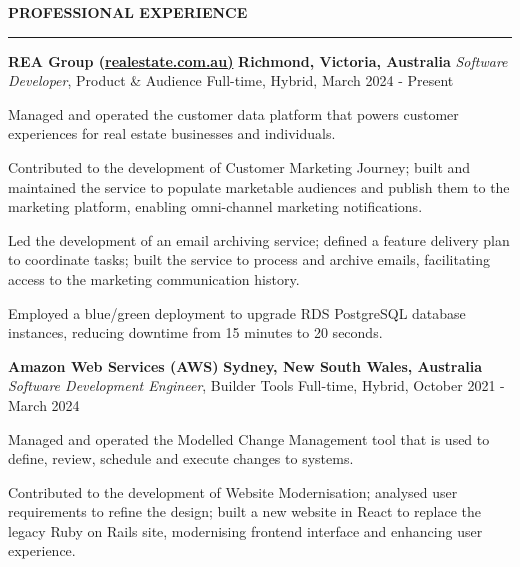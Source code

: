\documentclass{cv}
\begin{document}
\textbf{\uppercase{Professional Experience}}
\sectionlineskip
\hrule height 0.6pt
\begin{list}{}{\setlength{\leftmargin}{0pt}}
\item
    \textbf{REA Group (\href{https://realestate.com.au/}{realestate.com.au)}} \hfill \textbf{Richmond, Victoria, Australia}%
    \vspace{1.0pt} \newline 
    {\textit{Software Developer}, Product \& Audience} \hfill {Full-time, Hybrid, March 2024 - Present}%
    \begin{list}{\raisebox{2.0pt}{\tiny$\bullet$}\space}{\setlength{\leftmargin}{11.2pt}}
        \itemsep -5.0pt \vspace{-4.0pt}
        \item Managed and operated the customer data platform that powers customer experiences for real estate businesses and individuals.
        \item Contributed to the development of Customer Marketing Journey; built and maintained the service to populate marketable audiences and publish them to the marketing platform, enabling omni-channel marketing notifications.
        \item Led the development of an email archiving service; defined a feature delivery plan to coordinate tasks; built the service to process and archive emails, facilitating access to the marketing communication history.
        \item Employed a blue/green deployment to upgrade RDS PostgreSQL database instances, reducing downtime from 15 minutes to 20 seconds.
    \end{list}
\item 
    \textbf{Amazon Web Services (AWS)} \hfill \textbf{Sydney, New South Wales, Australia}%
    \vspace{1.0pt} \newline 
    {\textit{Software Development Engineer}, Builder Tools} \hfill {Full-time, Hybrid, October 2021 - March 2024}%
    \begin{list}{\raisebox{2.0pt}{\tiny$\bullet$}\space}{\setlength{\leftmargin}{11.2pt}}
        \itemsep -5.0pt \vspace{-4.0pt}
        \item Managed and operated the Modelled Change Management tool that is used to define, review, schedule and execute changes to systems.
        \item Contributed to the development of Website Modernisation; analysed user requirements to refine the design; built a new website in React to replace the legacy Ruby on Rails site, modernising frontend interface and enhancing user experience.

\end{list}
\end{list}
\end{document}
